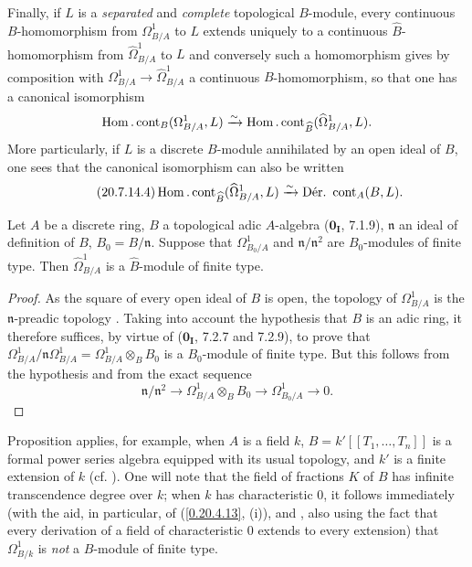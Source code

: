 \begin{env}[20.7.14]
Finally, if $L$ is a \emph{separated} and \emph{complete} topological $B$-module, every continuous $B$-homomorphism from $\Omega^1_{B/A}$ to $L$ extends uniquely to a continuous $\widehat{B}$-homomorphism from $\widehat{\Omega}^1_{B/A}$ to $L$ and conversely such a homomorphism gives by composition with $\Omega^1_{B/A}\to\widehat{\Omega}^1_{B/A}$ a continuous $B$-homomorphism, so that one has a canonical isomorphism
\[
  \operatorname{Hom}.\operatorname{cont}_B(\Omega^1_{B/A},L)\xrightarrow{\sim}\operatorname{Hom}.\operatorname{cont}_{\widehat{B}}(\widehat{\Omega}^1_{B/A},L).
\]
More particularly, if $L$ is a discrete $B$-module annihilated by an open ideal of $B$, one sees that the canonical isomorphism  can also be written
\begin{equation}
\tag{20.7.14.4}
  \label{0.20.7.14.4}
  \Hom.\operatorname{cont}_{\widehat{B}}(\widehat{\Omega}^1_{B/A},L)\xrightarrow{\sim}\operatorname{D\acute{e}r.\ cont}_A(B,L).
\end{equation}
\end{env}

\begin{proposition}[20.7.15]
\label{0.20.7.15}
Let $A$ be a discrete ring, $B$ a topological adic $A$-algebra ($\mathbf{0_I}$, 7.1.9), $\mathfrak{n}$ an ideal of definition of $B$, $B_0=B/\mathfrak{n}$.
Suppose that $\Omega^1_{B_0/A}$ and $\mathfrak{n}/\mathfrak{n}^2$ are $B_0$-modules of finite type.
Then $\widehat{\Omega}^1_{B/A}$ is a $\widehat{B}$-module of finite type.
\end{proposition}

\begin{proof}
As the square of every open ideal of $B$ is open, the topology of $\Omega^1_{B/A}$ is the $\mathfrak{n}$-preadic topology .
Taking into account the hypothesis that $B$ is an adic ring, it therefore suffices, by virtue of ($\mathbf{0_I}$, 7.2.7 and 7.2.9), to prove
that $\Omega^1_{B/A}/\mathfrak{n}\Omega^1_{B/A}=\Omega^1_{B/A}\otimes_B B_0$ is a $B_0$-module of finite type. But this follows from the hypothesis and from the exact sequence 
\[
  \mathfrak{n}/\mathfrak{n}^2\longrightarrow \Omega^1_{B/A}\otimes_B B_0\longrightarrow \Omega^1_{B_0/A}\longrightarrow 0.
\]
\end{proof}

\begin{env}[20.7.16]
\label{0.20.7.16}
Proposition  applies, for example, when $A$ is a field $k$, $B=k'[[T_1,\ldots,T_n]]$ is a formal power series algebra equipped with its usual topology, and $k'$ is a finite extension of $k$ (cf. ). One will note that the field of fractions $K$ of $B$ has infinite transcendence degree over $k$; when $k$ has characteristic $0$, it follows immediately (with the aid, in particular, of (\ref{0.20.4.13}, (i)), and , also using the fact that every derivation of a field of characteristic $0$ extends to every extension) that $\Omega^1_{B/k}$ is \emph{not} a $B$-module of finite type.
\end{env}

